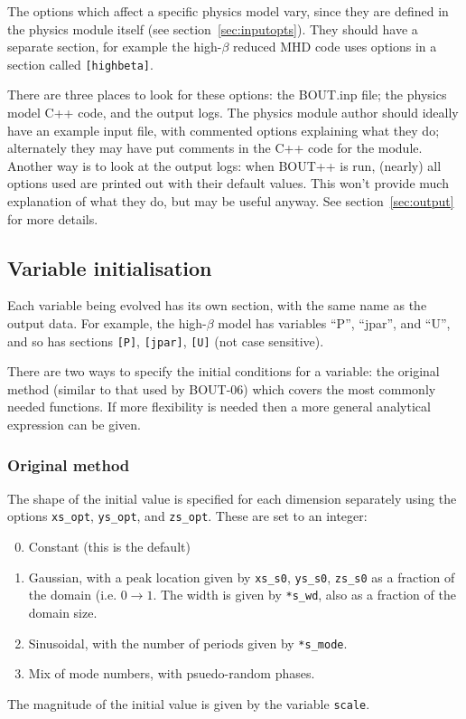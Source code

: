\documentclass[12pt]{article}
\newcommand{\code}[1]{\texttt{#1}}
\begin{document}
The options which affect a specific physics model vary, since they are defined in the physics module itself
(see section~\ref{sec:inputopts}). They should have a separate section, for example the high-$\beta$
reduced MHD code uses options in a section called \code{[highbeta]}.

There are three places to look for these options: the BOUT.inp file; the physics model C++ code, and 
the output logs. The physics module author should ideally have an example input file, with commented options
explaining what they do; alternately they may have put comments in the C++ code for the module. 
Another way is to look at the output logs: when BOUT++ is run, (nearly) all options used are printed 
out with their default values. This won't provide much explanation of what they do, but may be useful anyway.
See section~\ref{sec:output} for more details.

\subsection{Variable initialisation}
Each variable being evolved has its own section, with the same name as the
output data. For example, the high-$\beta$ model has variables ``P'',
``jpar'', and ``U'', and so has sections \code{[P]}, \code{[jpar]},
\code{[U]} (not case sensitive). 

There are two ways to specify the initial conditions for a variable:
the original method (similar to that used by BOUT-06) which covers
the most commonly needed functions. If more flexibility is needed then
a more general analytical expression can be given.

\subsubsection{Original method}

The shape of the initial value is specified for each dimension separately
using the options \code{xs\_opt}, \code{ys\_opt}, and \code{zs\_opt}. These
are set to an integer: 
\begin{enumerate}
\setcounter{enumi}{-1}
\item Constant (this is the default)
\item Gaussian, with a peak location given by \code{xs\_s0}, \code{ys\_s0},
  \code{zs\_s0} as a fraction of the domain (i.e. $0 \rightarrow 1$.
  The width is given by \code{*s\_wd}, also as a fraction of the domain size.
\item Sinusoidal, with the number of periods given by \code{*s\_mode}. 
\item Mix of mode numbers, with psuedo-random phases.
\end{enumerate}
The magnitude of the initial value is given by the variable \code{scale}.
\end{document}
